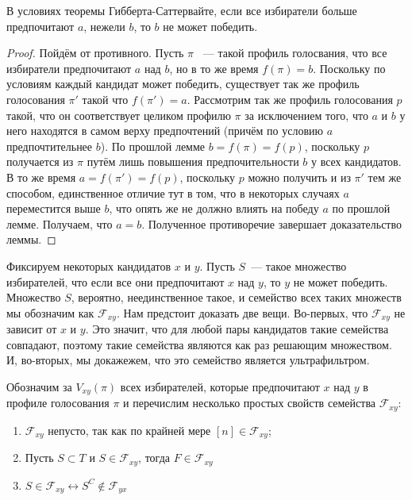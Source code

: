\begin{lemma}
В условиях теоремы Гибберта-Саттервайте, если все избиратели больше предпочитают $a$, нежели $b$, то $b$ не может победить.
\end{lemma}
\begin{proof}
Пойдём от противного. Пусть $\pi$ ~— такой профиль голосвания, что все избиратели предпочитают $a$ над $b$, но в то же время $f(\pi) = b$. Поскольку по условиям каждый кандидат может победить, существует так же профиль голосования $\pi'$ такой что $f(\pi') = a$. Рассмотрим так же профиль голосования $p$ такой, что он соответствует целиком профилю $\pi$ за исключением того, что $a$ и $b$ у него находятся в самом верху предпочтений (причём по условию $a$ предпочтительнее $b$). По прошлой лемме $b = f(\pi) = f(p)$, поскольку $p$ получается из $\pi$ путём лишь повышения предпочительности $b$ у всех кандидатов. В то же время $a = f(\pi') = f(p)$, поскольку $p$ можно получить и из $\pi'$ тем же способом, единственное отличие тут в том, что в некоторых случаях $a$ переместится выше $b$, что опять же не должно влиять на победу $a$ по прошлой лемме. Получаем, что $a=b$. Полученное противоречие завершает доказательство леммы.
\end{proof}

Фиксируем некоторых кандидатов $x$ и $y$. Пусть $S$~— такое множество избирателей, что если все они предпочитают $x$ над $y$, то $y$ не может победить. Множество $S$, вероятно, неединственное такое, и семейство всех таких множеств мы обозначим как $\mathcal{F}_{xy}$. Нам предстоит доказать две вещи. Во-первых, что $\mathcal{F}_{xy}$ не зависит от $x$ и $y$. Это значит, что для любой пары кандидатов такие семейства совпадают, поэтому такие семейства являются как раз решающим множеством. И, во-вторых, мы докажежем, что это семейство является ультрафильтром.

Обозначим за $V_{xy}(\pi)$ всех избирателей, которые предпочитают $x$ над $y$ в профиле голосования $\pi$ и перечислим несколько простых свойств семейства $\mathcal{F}_{xy}$:

\begin{enumerate}
\item $\mathcal{F}_{xy}$ непусто, так как по крайней мере $[n]\in\mathcal{F}_{xy}$;
\item Пусть $S\subset T$ и $S \in \mathcal{F}_{xy}$, тогда $F\in\mathcal{F}_{xy}$
\item $S\in\mathcal{F}_{xy} \leftrightarrow S^C\not\in\mathcal{F}_{yx}$
\end{enumerate}

